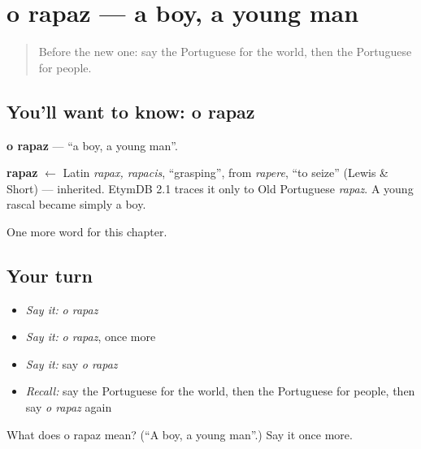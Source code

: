 \section[o rapaz]{o rapaz — a boy, a young man}

\label{lesson:PT-C102-rapaz}



\begin{quote}
Before the new one: say the Portuguese for the world, then the Portuguese for people.
\end{quote}

\subsection*{You'll want to know: o rapaz}
\textbf{o rapaz} — \textquotedblleft{}a boy, a young man\textquotedblright{}.

\begin{cousinweb}
\textbf{rapaz} $\leftarrow$ Latin \emph{rapax, rapacis}, \textquotedblleft{}grasping\textquotedblright{}, from \emph{rapere}, \textquotedblleft{}to seize\textquotedblright{} (Lewis \& Short) — inherited. EtymDB 2.1 traces it only to Old Portuguese \emph{rapaz}. A young rascal became simply a boy.
\end{cousinweb}

\begin{grammarlens}[title={What you've built}]
One more word for this chapter.
\end{grammarlens}

\subsection*{Your turn}
\begin{itemize}
\raggedright
  \item \emph{Say it:} \emph{o rapaz}
  \item \emph{Say it:} \emph{o rapaz}, once more
  \item \emph{Say it:} say \emph{o rapaz}
  \item \emph{Recall:} say the Portuguese for the world, then the Portuguese for people, then say \emph{o rapaz} again
\end{itemize}

\begin{tcolorbox}[breakable,colback=teal!4,colframe=teal!35!black,title={Before you move on}]
What does o rapaz mean? (\textquotedblleft{}A boy, a young man\textquotedblright{}.) Say it once more.
\end{tcolorbox}
